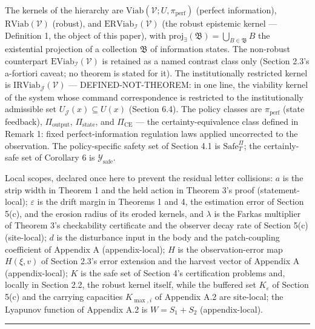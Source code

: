 \documentclass[11pt]{article}
\begin{document}
The kernels of the hierarchy are
\(\mathrm{Viab}(\mathcal{V}; U, \pi_{\mathrm{perf}})\) (perfect
information), \(\mathrm{RViab}(\mathcal{V})\) (robust), and
\(\mathrm{ERViab}_{\mathcal{I}}(\mathcal{V})\) (the robust epistemic
kernel --- Definition 1, the object of this paper), with
\(\mathrm{proj}_{\exists}(\mathfrak{B}) = \bigcup_{B \in \mathfrak{B}} B\)
the existential projection of a collection \(\mathfrak{B}\) of
information states. The non-robust counterpart
\(\mathrm{EViab}_{\mathcal{I}}(\mathcal{V})\) is retained as a named
contrast class only (Section 2.3's a-fortiori caveat; no theorem is
stated for it). The institutionally restricted kernel is
\(\mathrm{IRViab}_{\mathcal{J}}(\mathcal{V})\) --- DEFINED-NOT-THEOREM:
in one line, the viability kernel of the system whose command
correspondence is restricted to the institutionally admissible set
\(U_{\mathcal{J}}(x) \subseteq U(x)\) (Section 6.4). The policy classes
are \(\pi_{\mathrm{perf}}\) (state feedback), \(\Pi_{\mathrm{output}}\),
\(\Pi_{\mathrm{state}}\), and \(\Pi_{\mathrm{CE}}\) --- the
certainty-equivalence class defined in Remark 1: fixed
perfect-information regulation laws applied uncorrected to the
observation. The policy-specific safety set of Section 4.1 is
\(\mathrm{Safe}^{\Pi}_T\); the certainly-safe set of Corollary 6 is
\(\mathcal{Y}_{\mathrm{safe}}\).

Local scopes, declared once here to prevent the residual letter
collisions: \(a\) is the strip width in Theorem 1 and the held action in
Theorem 3's proof (statement-local); \(\varepsilon\) is the drift margin
in Theorems 1 and 4, the estimation error of Section 5(c), and the
erosion radius of its eroded kernels, and \(\lambda\) is the Farkas
multiplier of Theorem 3's checkability certificate and the observer
decay rate of Section 5(c) (site-local); \(d\) is the disturbance input
in the body and the patch-coupling coefficient of Appendix A
(appendix-local); \(H\) is the observation-error map \(H(\xi, v)\) of
Section 2.3's error extension and the harvest vector of Appendix A
(appendix-local); \(K\) is the safe set of Section 4's certification
problems and, locally in Section 2.2, the robust kernel itself, while
the buffered set \(K_\varepsilon\) of Section 5(c) and the carrying
capacities \(K_{\max,i}\) of Appendix A.2 are site-local; the Lyapunov
function of Appendix A.2 is \(W = S_1 + S_2\) (appendix-local).

\begin{center}\rule{0.5\linewidth}{0.5pt}\end{center}
\end{document}
